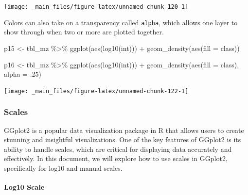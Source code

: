 \documentclass[
]{book}
\newenvironment{Shaded}{\begin{snugshade}}{\end{snugshade}}
\newcommand{\AttributeTok}[1]{\textcolor[rgb]{0.77,0.63,0.00}{#1}}
\newcommand{\DecValTok}[1]{\textcolor[rgb]{0.00,0.00,0.81}{#1}}
\newcommand{\FunctionTok}[1]{\textcolor[rgb]{0.00,0.00,0.00}{#1}}
\newcommand{\NormalTok}[1]{#1}
\newcommand{\OtherTok}[1]{\textcolor[rgb]{0.56,0.35,0.01}{#1}}
\newcommand{\SpecialCharTok}[1]{\textcolor[rgb]{0.00,0.00,0.00}{#1}}
\begin{document}
\begin{center}\texttt{[image: \_main\_files/figure-latex/unnamed-chunk-120-1]} \end{center}

Colors can also take on a transparency called \texttt{alpha}, which allows one layer to show through when two or more are plotted together.

\begin{Shaded}
\begin{Highlighting}[]
\NormalTok{p15 }\OtherTok{\textless{}{-}}\NormalTok{ tbl\_mz }\SpecialCharTok{\%\textgreater{}\%} 
  \FunctionTok{ggplot}\NormalTok{(}\FunctionTok{aes}\NormalTok{(}\FunctionTok{log10}\NormalTok{(int))) }\SpecialCharTok{+} 
  \FunctionTok{geom\_density}\NormalTok{(}\FunctionTok{aes}\NormalTok{(}\AttributeTok{fill =}\NormalTok{ class))}

\NormalTok{p16 }\OtherTok{\textless{}{-}}\NormalTok{ tbl\_mz }\SpecialCharTok{\%\textgreater{}\%} 
  \FunctionTok{ggplot}\NormalTok{(}\FunctionTok{aes}\NormalTok{(}\FunctionTok{log10}\NormalTok{(int))) }\SpecialCharTok{+} 
  \FunctionTok{geom\_density}\NormalTok{(}\FunctionTok{aes}\NormalTok{(}\AttributeTok{fill =}\NormalTok{ class), }\AttributeTok{alpha =}\NormalTok{ .}\DecValTok{25}\NormalTok{)}
\end{Highlighting}
\end{Shaded}

\begin{center}\texttt{[image: \_main\_files/figure-latex/unnamed-chunk-122-1]} \end{center}

\hypertarget{scales}{%
\subsubsection*{Scales}\label{scales}}

GGplot2 is a popular data visualization package in R that allows users to create stunning and insightful visualizations. One of the key features of GGplot2 is its ability to handle scales, which are critical for displaying data accurately and effectively. In this document, we will explore how to use scales in GGplot2, specifically for log10 and manual scales.

\hypertarget{log10-scale}{%
\paragraph*{Log10 Scale}\label{log10-scale}}
\end{document}
